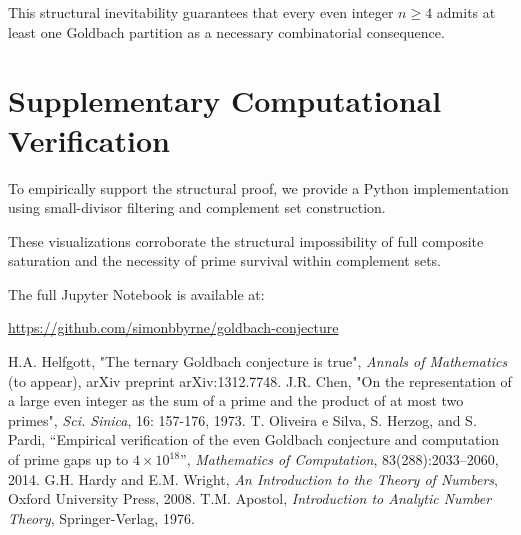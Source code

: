 \documentclass[11pt]{article}
\begin{document}
	This structural inevitability guarantees that every even integer \( n \geq 4 \) admits at least one Goldbach partition as a necessary combinatorial consequence.

	

	\section*{Supplementary Computational Verification}
	
	To empirically support the structural proof, we provide a Python implementation using small-divisor filtering and complement set construction.
	
	These visualizations corroborate the structural impossibility of full composite saturation and the necessity of prime survival within complement sets.
	
	The full Jupyter Notebook is available at:
	
	\url{https://github.com/simonbbyrne/goldbach-conjecture}
	
	
	
	
	\begin{thebibliography}{9}
		 H.A. Helfgott, "The ternary Goldbach conjecture is true", \emph{Annals of Mathematics} (to appear), arXiv preprint arXiv:1312.7748.
		 J.R. Chen, "On the representation of a large even integer as the sum of a prime and the product of at most two primes", \emph{Sci. Sinica}, 16: 157-176, 1973.
		 T. Oliveira e Silva, S. Herzog, and S. Pardi, ``Empirical verification of the even Goldbach conjecture and computation of prime gaps up to \( 4 \times 10^{18} \)'', \emph{Mathematics of Computation}, 83(288):2033--2060, 2014.
		 G.H. Hardy and E.M. Wright, \emph{An Introduction to the Theory of Numbers}, Oxford University Press, 2008.
		 T.M. Apostol, \emph{Introduction to Analytic Number Theory}, Springer-Verlag, 1976.
	\end{thebibliography}

	
\end{document}
